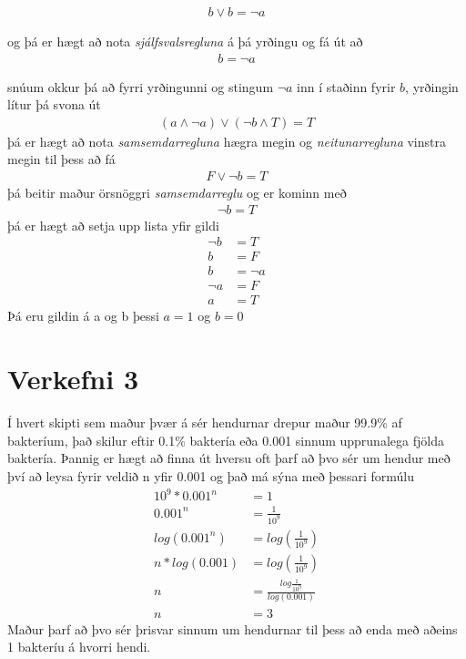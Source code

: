 \documentclass{article}
\begin{document}
\begin{align*}
    b\lor b=\lnot a
\end{align*} 

og þá er hægt að nota \emph{sjálfsvalsregluna} á þá yrðingu og fá út að 
\begin{align*}
    b=\lnot a
\end{align*}

snúum okkur þá að fyrri yrðingunni og stingum $\lnot a$ inn í staðinn fyrir $b$, yrðingin lítur þá svona út
\begin{align*}
    (a\land \lnot a)\lor(\lnot b\land T)=T
\end{align*}
þá er hægt að nota \emph{samsemdarregluna} hægra megin og \emph{neitunarregluna} vinstra megin til þess að fá
\begin{align*}
    F\lor\lnot b=T
\end{align*}
þá beitir maður örsnöggri \emph{samsemdarreglu} og er kominn með
\begin{align*}
    \lnot b = T
\end{align*}
þá er hægt að setja upp lista yfir gildi
\begin{align*}
    \lnot b&= T\\
    b&=F\\
    b&=\lnot a\\
    \lnot a&=F\\
    a&=T
\end{align*}
Þá eru gildin á a og b þessi $a=1$ og $b=0$

\newpage
\section*{Verkefni 3}
Í hvert skipti sem maður þvær á sér hendurnar drepur maður 99.9\% af bakteríum, það skilur eftir 0.1\% baktería eða 0.001 sinnum upprunalega fjölda baktería. 
Þannig er hægt að finna út hversu oft þarf að þvo sér um hendur með því að leysa fyrir veldið n yfir 0.001 og það má sýna með þessari formúlu
\begin{align}
    10^9*0.001^n&=1\\
    0.001^n&=\frac{1}{10^9}\\
    log(0.001^n)&=log(\frac{1}{10^9})\\
    n*log(0.001)&=log(\frac{1}{10^9})\\
    n&=\frac{log\frac{1}{10^9}}{log(0.001)}\\
    n&=3
\end{align}
Maður þarf að þvo sér þrisvar sinnum um hendurnar til þess að enda með aðeins 1 bakteríu á hvorri hendi.
\end{document}
